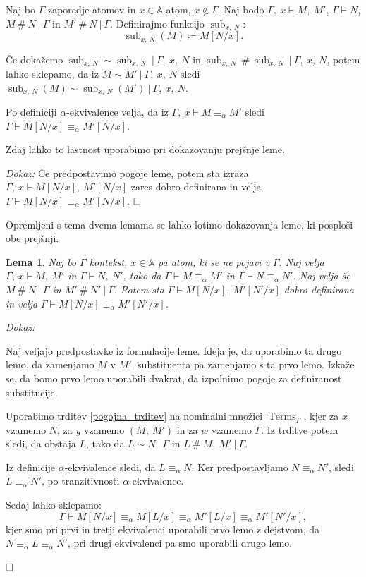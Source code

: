 \documentclass{article}
\DeclareMathOperator{\Terms}{Terms}
\DeclareMathOperator{\sub}{sub}
\def\qed{$\hfill\Box$}   %
\newtheorem{lema}{Lema}
\begin{document}
Naj bo \(\Gamma\) zaporedje atomov in \(x \in \mathds{A}\) atom, \(x \notin \Gamma\).
Naj bodo \(\Gamma,\ x \vdash M,\ M'\), \(\Gamma \vdash N\), \(M \ \#\ N \ \vert\ \Gamma\) in \(M' \ \#\ N \ \vert\ \Gamma\). Definirajmo funkcijo \(\sub_{x,\ N}\): \[\sub_{x,\ N}(M) \coloneq M[N/x].\]

Če dokažemo \(\sub_{x,\ N} \sim \sub_{x,\ N} \ \vert\ \Gamma,\ x,\ N\) in \(\sub_{x,\ N} \ \#\ \sub_{x,\ N} \ \vert\ \Gamma,\ x,\ N\), potem lahko sklepamo, da iz \(M \sim M' \ \vert\ \Gamma,\ x,\ N\) sledi \(\sub_{x,\ N}(M) \sim \sub_{x,\ N}(M') \ \vert\ \Gamma,\ x,\ N\).


Po definiciji \(\alpha\)-ekvivalence velja, da iz \(\Gamma,\ x \vdash M \equiv_\alpha M'\) sledi \(\Gamma \vdash M[N/x] \equiv_\alpha M'[N/x]\).

Zdaj lahko to lastnost uporabimo pri dokazovanju prejšnje leme.

\noindent
{\em Dokaz:\/}
Če predpostavimo pogoje leme, potem sta izraza \(\Gamma,\ x \vdash M[N/x],\ M'[N/x]\) zares dobro definirana in velja \(\Gamma \vdash M[N/x] \equiv_\alpha M'[N/x]\). 
\qed

Opremljeni s tema dvema lemama se lahko lotimo dokazovanja leme, ki posploši obe prejšnji.

\begin{lema}
    Naj bo \(\Gamma\) kontekst, \(x \in \mathds{A}\) pa atom, ki se ne pojavi v \(\Gamma\). Naj velja \(\Gamma,\ x \vdash M,\ M'\) in \(\Gamma \vdash N,\ N'\), tako da \(\Gamma \vdash M \equiv_\alpha M'\) in \(\Gamma \vdash N \equiv_\alpha N'\). Naj velja še \(M \ \#\ N \ \vert\ \Gamma\) in \(M' \ \#\ N' \ \vert\ \Gamma\). Potem sta \(\Gamma \vdash M[N/x],\ M'[N'/x]\) dobro definirana in velja \(\Gamma \vdash M[N/x] \equiv_\alpha M'[N'/x]\).
\end{lema}

\noindent
{\em Dokaz:\/}

Naj veljajo predpostavke iz formulacije leme.
Ideja je, da uporabimo ta drugo lemo, da zamenjamo \(M\) v \(M'\), substituenta pa zamenjamo s ta prvo lemo. Izkaže se, da bomo prvo lemo uporabili dvakrat, da izpolnimo pogoje za definiranost substitucije.

Uporabimo trditev \ref{pogojna_trditev} na nominalni množici \(\Terms_\Gamma\), kjer za \(x\) vzamemo \(N\), za \(y\) vzamemo \((M,\ M')\) in za \(w\) vzamemo \(\Gamma\). Iz trditve potem sledi, da obstaja \(L\), tako da \(L \sim N \ \vert\ \Gamma\) in \(L \ \#\ M,\ M' \ \vert\ \Gamma\).

Iz definicije \(\alpha\)-ekvivalence sledi, da \(L \equiv_\alpha N\). Ker predpostavljamo \(N \equiv_\alpha N'\), sledi \(L \equiv_\alpha N'\), po tranzitivnosti \(\alpha\)-ekvivalence.

Sedaj lahko sklepamo:
\[
    \Gamma \vdash M[N/x] \equiv_\alpha M[L/x] \equiv_\alpha M'[L/x] \equiv_\alpha M'[N'/x],
\]
kjer smo pri prvi in tretji ekvivalenci uporabili prvo lemo z dejstvom, da \(N \equiv_\alpha L \equiv_\alpha N'\), pri drugi ekvivalenci pa smo uporabili drugo lemo.

\qed
\end{document}
